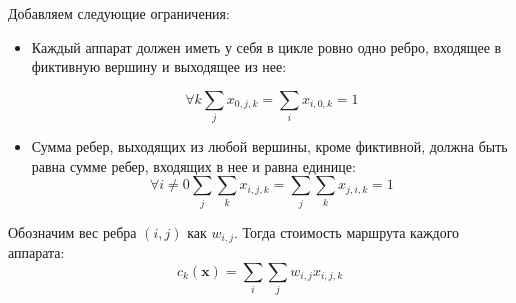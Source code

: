 \documentclass[a4paper,14pt,russian]{article}
\begin{document}
Добавляем следующие ограничения:
\begin{itemize}

\item Каждый аппарат должен иметь у себя в цикле ровно одно ребро, входящее в фиктивную вершину и выходящее из нее:


\begin{equation}
\forall k \displaystyle\sum_j x_{0,j,k} = \displaystyle\sum_i x_{i,0,k} = 1
\end{equation}

\item Сумма ребер, выходящих из любой вершины, кроме фиктивной, должна быть равна сумме ребер, входящих в нее и равна единице:
\begin{equation}
\forall i \neq 0 \displaystyle\sum_j \displaystyle\sum_k x_{i,j,k} = \displaystyle\sum_j \displaystyle\sum_k x_{j,i,k} = 1
\end{equation}

\end{itemize}

Обозначим вес ребра $(i, j)$ как $w_{i,j}$. Тогда стоимость маршрута каждого аппарата:
\begin{equation}
c_k(\mathbf{x}) = \displaystyle\sum_i \displaystyle\sum_j w_{i,j} x_{i,j,k}
\end{equation}


\end{document}
